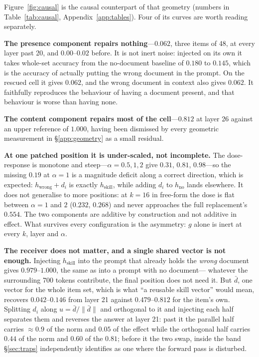 \documentclass{article}
\newcommand{\dvec}{\ensuremath{d}}
\newcommand{\gvec}{\ensuremath{g}}
\begin{document}
Figure~\ref{fig:causal} is the causal counterpart of that geometry (numbers in
Table~\ref{tab:causal}, Appendix~\ref{app:tables}). Four of its curves are worth
reading separately.

\textbf{The presence component repairs nothing}---$0.062$, three items of 48, at
every layer past 20, and $0.00$--$0.02$ before. It is not inert noise: injected
on its own it takes whole-set accuracy from the no-document baseline of $0.180$
to $0.145$, which is the accuracy of actually putting the wrong document in the
prompt. On the rescued cell it gives $0.062$, and the wrong document in context
also gives $0.062$. It faithfully reproduces the behaviour of having a document
present, and that behaviour is worse than having none.

\textbf{The content component repairs most of the cell}---$0.812$ at layer 26
against an upper reference of $1.000$, having been dismissed by every geometric
measurement in \S\ref{app:geometry} as a small residual.

\textbf{At one patched position it is under-scaled, not incomplete.} The
dose-response is monotone and steep---$\alpha=0.5,1,2$ give $0.31$, $0.81$,
$0.98$---so the missing $0.19$ at $\alpha=1$ is a magnitude deficit along a
correct direction, which is expected: $h_{\text{wrong}} + \dvec_i$ is exactly
$h_{\text{skill}}$, while adding $\dvec_i$ to $h_{\text{no}}$ lands elsewhere.
It does not generalise to more positions: at $k=16$ in free-form the dose is
flat between $\alpha=1$ and $2$ ($0.232$, $0.268$) and never approaches the full
replacement's $0.554$. The two components are additive by construction and not
additive in effect. What survives every configuration is the asymmetry: $\gvec$
alone is inert at every $k$, layer and $\alpha$.

\textbf{The receiver does not matter, and a single shared vector is not enough.}
Injecting $h_{\text{skill}}$ into the prompt that already holds the \emph{wrong}
document gives $0.979$--$1.000$, the same as into a prompt with no document---%
whatever the surrounding 700 tokens contribute, the final position does not need
it. But $\bar{\dvec}$, one vector for the whole item set, which is what ``a
reusable skill vector'' would mean, recovers $0.042$--$0.146$ from layer 21
against $0.479$--$0.812$ for the item's own. Splitting $\dvec_i$ along
$u=\bar{\dvec}/\|\bar{\dvec}\|$ and orthogonal to it and injecting each half
separates them and reverses the answer at layer 21: past it the parallel half
carries $\approx 0.9$ of the norm and $0.05$ of the effect while the orthogonal
half carries $0.44$ of the norm and $0.60$ of the $0.81$; before it the two swap,
inside the band \S\ref{sec:traps} independently identifies as one where the
forward pass is disturbed.
\end{document}
